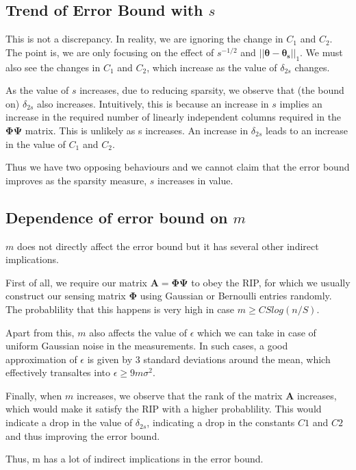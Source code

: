 \documentclass[a4paper,11pt]{article}
\numberwithin{definition}{section}
\numberwithin{mytheorem}{subsection}
\begin{document}
\subsection{Trend of Error Bound with $s$}
This is not a discrepancy. In reality, we are ignoring the change in $C_1$ and $C_2$. The point is, we are only focusing on the effect of $s^{-1/2}$ and $||\boldsymbol{\theta}-\boldsymbol{\theta_s}||_1$. We must also see the changes in $C_1$ and $C_2$, which increase as the value of $\delta_{2s}$ changes.

As the value of $s$ increases, due to reducing sparsity, we observe that (the bound on) $\delta_{2s}$ also increases. Intuitively, this is because an increase in $s$ implies an increase in the required number of linearly independent columns required in the $\boldsymbol{\Phi \Psi}$ matrix. This is unlikely as s increases. An increase in $\delta_{2s}$ leads to an increase in the value of $C_1$ and $C_2$.

Thus we have two opposing behaviours and we cannot claim that the error bound improves as the sparsity measure, $s$ increases in value.

\subsection{Dependence of error bound on $m$}

$m$ does not directly affect the error bound but it has several other indirect implications. 

First of all, we require our matrix $\boldsymbol{A}=\boldsymbol{\Phi \Psi}$ to obey the RIP, for which we usually construct our sensing matrix $\boldsymbol{\Phi}$ using Gaussian or Bernoulli entries randomly. The probablility that this happens is very high in case $m \geq CS log(n/S)$.

Apart from this, $m$ also affects the value of $\epsilon$ which we can take in case of uniform Gaussian noise in the measurements. In such cases, a good approximation of $\epsilon$ is given by 3 standard deviations around the mean, which effectively transaltes into $\epsilon \geq 9m\sigma^2$.

Finally, when $m$ increases, we observe that the rank of the matrix $\boldsymbol{A}$ increases, which would make it satisfy the RIP with a higher probablility. This would indicate a drop in the value of $\delta_{2s}$, indicating a drop in the constants $C1$ and $C2$ and thus improving the error bound.

Thus, m has a lot of indirect implications in the error bound.
\end{document}
